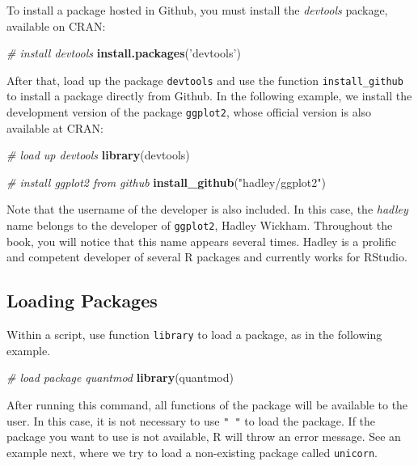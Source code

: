 \documentclass[11pt,]{book}
\newenvironment{Shaded}{\begin{snugshade}}{\end{snugshade}}
\newcommand{\KeywordTok}[1]{\textcolor[rgb]{0.27,0.27,0.27}{\textbf{#1}}}
\newcommand{\StringTok}[1]{\textcolor[rgb]{0.5,0.5,0.5}{#1}}
\newcommand{\CommentTok}[1]{\textcolor[rgb]{0.56,0.35,0.01}{\textit{#1}}}
\newcommand{\NormalTok}[1]{#1}
\begin{document}
To install a package hosted in Github, you must install the
\emph{devtools} package, available on CRAN: 

\begin{Shaded}
\begin{Highlighting}[]
\CommentTok{# install devtools}
\KeywordTok{install.packages}\NormalTok{(}\StringTok{'devtools'}\NormalTok{)}
\end{Highlighting}
\end{Shaded}

After that, load up the package \texttt{devtools} and use the function
\texttt{install\_github} to install a package directly from Github. In
the following example, we install the development version of the package
\texttt{ggplot2}, whose official version is also available at CRAN:

\begin{Shaded}
\begin{Highlighting}[]
\CommentTok{# load up devtools}
\KeywordTok{library}\NormalTok{(devtools)}

\CommentTok{# install ggplot2 from github}
\KeywordTok{install_github}\NormalTok{(}\StringTok{"hadley/ggplot2"}\NormalTok{)}
\end{Highlighting}
\end{Shaded}

Note that the username of the developer is also included. In this case,
the \emph{hadley} name belongs to the developer of \texttt{ggplot2},
Hadley Wickham. Throughout the book, you will notice that this name
appears several times. Hadley is a prolific and competent developer of
several R packages and currently works for RStudio.

\subsection{Loading Packages}\label{loading-packages}

Within a script, use function \texttt{library} to load a package, as in
the following example. 

\begin{Shaded}
\begin{Highlighting}[]
\CommentTok{# load package quantmod}
\KeywordTok{library}\NormalTok{(quantmod)}
\end{Highlighting}
\end{Shaded}

After running this command, all functions of the package will be
available to the user. In this case, it is not necessary to use
\texttt{"\ "} to load the package. If the package you want to use is not
available, R will throw an error message. See an example next, where we
try to load a non-existing package called \texttt{unicorn}.
\end{document}
